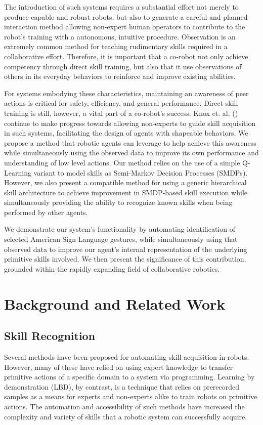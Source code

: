 \documentclass[letterpaper]{article}
\begin{document}
  The introduction of such systems requires a substantial effort not merely to produce capable and robust robots, but also to generate a careful and planned interaction method allowing non-expert human operators to contribute to the robot's training with a autonomous, intuitive procedure.  Observation is an extremely common method for teaching rudimentary skills required in a collaborative effort.  Therefore, it is important that a co-robot not only achieve competency through direct skill training, but also that it use observations of others in its everyday behaviors to reinforce and improve existing abilities.

  For systems embodying these characteristics, maintaining an awareness of peer actions is critical for safety, efficiency, and general performance. Direct skill training is still, however, a vital part of a co-robot's success.  Knox et. al. (\citeyear{TAMER2}) continue to make progress towards allowing non-experts to guide skill acquisition in such systems, facilitating the design of agents with shapeable behaviors. We propose a method that robotic agents can leverage to help achieve this awareness while simultaneously using the observed data to improve its own performance and understanding of low level actions.  Our method relies on the use of a simple Q-Learning variant to model skills as Semi-Markov Decision Processes (SMDPs).  However, we also present a compatible method for using a generic hierarchical skill architecture to achieve improvement in SMDP-based skill execution while simultaneously providing the ability to recognize known skills when being performed by other agents. 

  We demonstrate our system's functionality by automating identification of selected American Sign Language gestures, while simultaneously using that observed data to improve our agent's internal representation of the underlying primitive skills involved. We then present the significance of this contribution, grounded within the rapidly expanding field of collaborative robotics.

\section{Background and Related Work}
\label{sec:background}
\subsection{Skill Recognition}
  Several methods have been proposed for automating skill acquisition in robots.  However, many of these have relied on using expert knowledge to transfer primitive actions of a specific domain to a system via programming.  Learning by demonstration (LBD), by contrast, is a technique that relies on prerecorded samples as a means for experts and non-experts alike to train robots on primitive actions.  The automation and accessibility of such methods have increased the complexity and variety of skills that a robotic system can successfully acquire.
\end{document}
